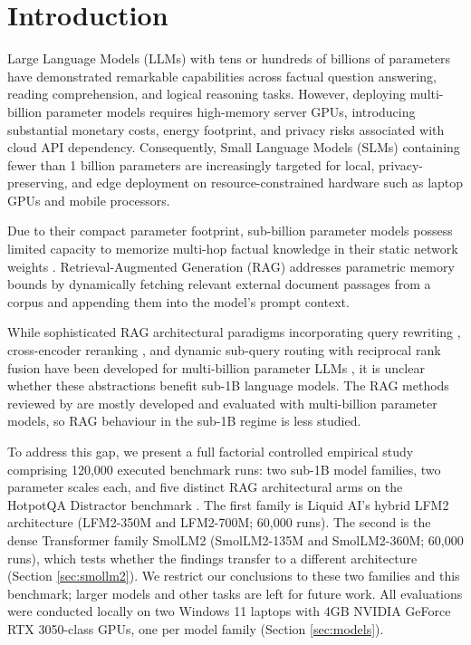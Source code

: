 \documentclass[10pt]{article}
\begin{document}
\section{Introduction}
\label{sec:intro}

Large Language Models (LLMs) with tens or hundreds of billions of parameters have demonstrated remarkable capabilities across factual question answering, reading comprehension, and logical reasoning tasks. However, deploying multi-billion parameter models requires high-memory server GPUs, introducing substantial monetary costs, energy footprint, and privacy risks associated with cloud API dependency. Consequently, Small Language Models (SLMs) containing fewer than 1 billion parameters are increasingly targeted for local, privacy-preserving, and edge deployment on resource-constrained hardware such as laptop GPUs and mobile processors.

Due to their compact parameter footprint, sub-billion parameter models possess limited capacity to memorize multi-hop factual knowledge in their static network weights \citep{mallen2023when, gao2023retrieval}. Retrieval-Augmented Generation (RAG) \citep{lewis2020retrieval} addresses parametric memory bounds by dynamically fetching relevant external document passages from a corpus and appending them into the model's prompt context.

While sophisticated RAG architectural paradigms incorporating query rewriting \citep{ma2023query}, cross-encoder reranking \citep{nogueira2019passage}, and dynamic sub-query routing with reciprocal rank fusion \citep{cormack2009reciprocal} have been developed for multi-billion parameter LLMs \citep{li2024retrieval, asai2023self}, it is unclear whether these abstractions benefit sub-1B language models. The RAG methods reviewed by \citet{gao2023retrieval} are mostly developed and evaluated with multi-billion parameter models, so RAG behaviour in the sub-1B regime is less studied.

To address this gap, we present a full factorial controlled empirical study comprising 120,000 executed benchmark runs: two sub-1B model families, two parameter scales each, and five distinct RAG architectural arms on the HotpotQA Distractor benchmark \citep{yang2018hotpotqa}. The first family is Liquid AI's hybrid LFM2 architecture \citep{liquid2024lfm} (LFM2-350M and LFM2-700M; 60,000 runs). The second is the dense Transformer family SmolLM2 \citep{allal2025smollm2} (SmolLM2-135M and SmolLM2-360M; 60,000 runs), which tests whether the findings transfer to a different architecture (Section \ref{sec:smollm2}). We restrict our conclusions to these two families and this benchmark; larger models and other tasks are left for future work. All evaluations were conducted locally on two Windows 11 laptops with 4GB NVIDIA GeForce RTX 3050-class GPUs, one per model family (Section \ref{sec:models}).
\end{document}
